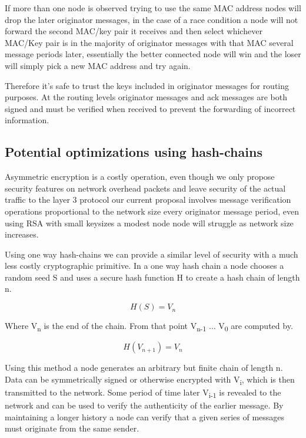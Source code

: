 \documentclass[11pt]{article}
\begin{document}
               If more than one node is observed trying to use the same MAC address nodes will drop the later originator messages, in the case of a race condition a node will not forward the second MAC/key pair it receives and then select whichever MAC/Key pair is in the majority of originator messages with that MAC several message periods later, essentially the better connected node will win and the loser will simply pick a new MAC address and try again.
               
               Therefore it's safe to trust the keys included in originator messages for routing purposes. At the routing levels originator messages and ack messages are both signed and must be verified when received to prevent the forwarding of incorrect information.  
                   
    \subsection{Potential optimizations using hash-chains} \label{crypto}
    
               Asymmetric encryption is a costly operation, even though we only propose security features on network overhead packets and leave security of the actual traffic to the layer 3 protocol our current proposal involves message verification operations proportional to the network size every originator message period, even using RSA with small keysizes a modest node node will struggle as network size increases.
               
               Using one way hash-chains we can provide a similar level of security with a much less costly cryptographic primitive. In a one way hash chain a node chooses a random seed S and uses a secure hash function H to create a hash chain of length n. 
               
               \[H(S) = V_n\] 
               
               Where V\textsubscript{n} is the end of the chain. From that point V\textsubscript{n-1} ... V\textsubscript{0} are computed by.
               
               \[H(V_{n+1}) = V_n\] 
               
               Using this method a node generates an arbitrary but finite chain of length n. Data can be symmetrically signed or otherwise encrypted with V\textsubscript{i}, which is then transmitted to the network. Some period of time later V\textsubscript{i-1} is revealed to the network and can be used to verify the authenticity of the earlier message. By maintaining a longer history a node can verify that a given series of messages must originate from the same sender.
               
\end{document}
